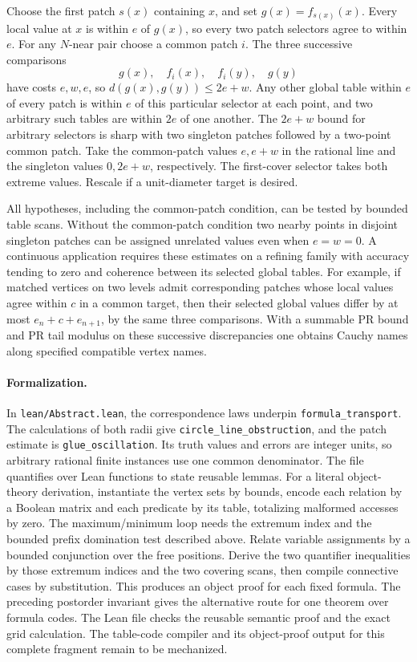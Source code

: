 Choose the first patch $s(x)$ containing $x$, and set
$g(x)=f_{s(x)}(x)$. Every local value at $x$ is within $e$ of $g(x)$,
so every two patch selectors agree to within $e$. For any $N$-near
pair choose a common patch $i$. The three successive comparisons
\[
 g(x),\quad f_i(x),\quad f_i(y),\quad g(y)
\]
have costs $e,w,e$, so $d(g(x),g(y))\leq2e+w$. Any other global
table within $e$ of every patch is within $e$ of this particular selector
at each point, and two arbitrary such tables are within $2e$ of one
another. The $2e+w$ bound for arbitrary selectors is sharp with two singleton
patches followed by a two-point common patch. Take the common-patch
values $e,e+w$ in the rational line and the singleton values $0,2e+w$,
respectively. The first-cover selector takes both extreme values.
Rescale if a unit-diameter target is desired.

All hypotheses, including the common-patch condition, can be tested by
bounded table scans. Without the common-patch condition two nearby
points in disjoint singleton patches can be assigned unrelated values
even when $e=w=0$. A continuous application requires these estimates on
a refining family with accuracy tending to zero and coherence between
its selected global tables. For example, if matched vertices on two
levels admit corresponding patches whose local values agree within
$c$ in a common target, then their selected global values differ by at most
$e_n+c+e_{n+1}$, by the same three comparisons. With a summable PR
bound and PR tail modulus on these successive discrepancies one obtains
Cauchy names along specified compatible vertex names.

\begingroup\setlength{\emergencystretch}{3em}
\paragraph{Formalization.}
In \texttt{lean/Abstract.lean}, the correspondence laws underpin
\texttt{formula\_\allowbreak transport}. The calculations of both radii give
\texttt{circle\_\allowbreak line\_\allowbreak obstruction}, and the patch estimate is
\texttt{glue\_\allowbreak oscillation}. Its truth values and errors are integer units,
so arbitrary rational finite instances use one common denominator. The
file quantifies over Lean functions to state reusable lemmas. For a literal
object-theory derivation, instantiate the vertex sets by bounds, encode
each relation by a Boolean matrix and each predicate by its table,
totalizing malformed accesses by zero. The maximum/minimum loop needs
the extremum index and the bounded prefix domination test described
above. Relate variable assignments by a bounded conjunction over the
free positions. Derive the two quantifier inequalities by those extremum
indices and the two covering scans, then compile connective cases by
substitution. This produces an object proof for each fixed formula. The preceding postorder invariant gives the alternative route for one theorem over formula codes.
The Lean file checks the reusable semantic proof and the exact grid
calculation. The table-code compiler and its object-proof output for
this complete fragment remain to be mechanized.
\par\endgroup
